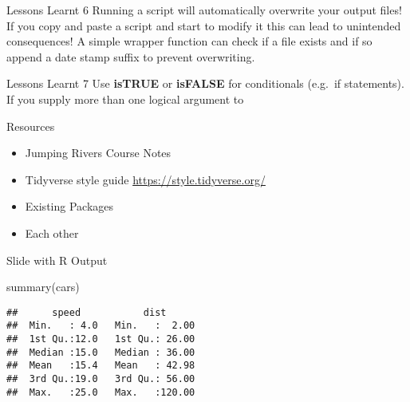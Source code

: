 \documentclass[
  ignorenonframetext,
]{beamer}
\newenvironment{Shaded}{\begin{snugshade}}{\end{snugshade}}
\newcommand{\FunctionTok}[1]{\textcolor[rgb]{0.00,0.00,0.00}{#1}}
\newcommand{\NormalTok}[1]{#1}
\providecommand{\tightlist}{%
  \setlength{\itemsep}{0pt}\setlength{\parskip}{0pt}}
\begin{document}
\begin{frame}{Lessons Learnt 6}
\protect\hypertarget{lessons-learnt-6}{}
Running a script will automatically overwrite your output files! If you
copy and paste a script and start to modify it this can lead to
unintended consequences! A simple wrapper function can check if a file
exists and if so append a date stamp suffix to prevent overwriting.
\end{frame}

\begin{frame}{Lessons Learnt 7}
\protect\hypertarget{lessons-learnt-7}{}
Use \textbf{isTRUE} or \textbf{isFALSE} for conditionals (e.g.~if
statements). If you supply more than one logical argument to
\end{frame}

\begin{frame}{Resources}
\protect\hypertarget{resources}{}
\begin{itemize}
\tightlist
\item
  Jumping Rivers Course Notes
\item
  Tidyverse style guide \url{https://style.tidyverse.org/}
\item
  Existing Packages
\item
  Each other
\end{itemize}
\end{frame}

\begin{frame}[fragile]{Slide with R Output}
\protect\hypertarget{slide-with-r-output}{}
\begin{Shaded}
\begin{Highlighting}[]
\FunctionTok{summary}\NormalTok{(cars)}
\end{Highlighting}
\end{Shaded}

\begin{verbatim}
##      speed           dist       
##  Min.   : 4.0   Min.   :  2.00  
##  1st Qu.:12.0   1st Qu.: 26.00  
##  Median :15.0   Median : 36.00  
##  Mean   :15.4   Mean   : 42.98  
##  3rd Qu.:19.0   3rd Qu.: 56.00  
##  Max.   :25.0   Max.   :120.00
\end{verbatim}
\end{frame}
\end{document}
